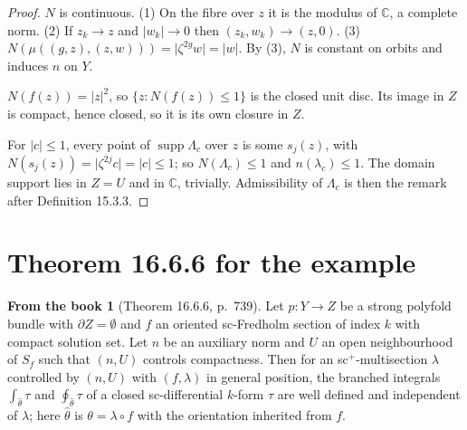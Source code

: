 \documentclass[11pt,a4paper]{article}
\theoremstyle{plain}
\theoremstyle{definition}
\newtheorem{recall}[theorem]{From the book}
\theoremstyle{remark}
\newcommand{\C}{\mathbb{C}}
\newcommand{\abs}[1]{\lvert #1\rvert}
\newcommand{\supp}{\operatorname{supp}}
\begin{document}
\begin{proof}
$N$ is continuous. (1) On the fibre over $z$ it is the modulus of $\C$, a complete norm. (2) If
$z_k\to z$ and $\abs{w_k}\to0$ then $(z_k,w_k)\to(z,0)$. (3)
$N(\mu((g,z),(z,w)))=\abs{\zeta^{2g}w}=\abs w$. By (3), $N$ is constant on orbits and induces $n$ on
$Y$.

$N(f(z))=\abs{z}^2$, so $\{z: N(f(z))\le1\}$ is the closed unit disc. Its image in $Z$ is compact, hence
closed, so it is its own closure in $Z$.

For $\abs c\le1$, every point of $\supp\Lambda_c$ over $z$ is some $s_j(z)$, with
$N(s_j(z))=\abs{\zeta^{2j}c}=\abs c\le1$; so $N(\Lambda_c)\le1$ and $n(\lambda_c)\le1$. The domain
support lies in $Z=U$ and in $\C$, trivially. Admissibility of $\Lambda_c$ is then the remark after
Definition 15.3.3.
\end{proof}

\section{Theorem 16.6.6 for the example}\label{sec:theorem}

\begin{recall}[Theorem 16.6.6, p.~739]
Let $p\colon Y\to Z$ be a strong polyfold bundle with $\partial Z=\emptyset$ and $f$ an oriented
sc-Fredholm section of index $k$ with compact solution set. Let $n$ be an auxiliary norm and $U$ an open
neighbourhood of $S_f$ such that $(n,U)$ controls compactness. Then for an sc$^+$-multisection $\lambda$
controlled by $(n,U)$ with $(f,\lambda)$ in general position, the branched integrals $\int_{\hat\theta}\tau$
and $\oint_{\hat\theta}\tau$ of a closed sc-differential $k$-form $\tau$ are well defined and independent
of $\lambda$; here $\hat\theta$ is $\theta=\lambda\circ f$ with the orientation inherited from $f$.
\end{recall}
\end{document}
